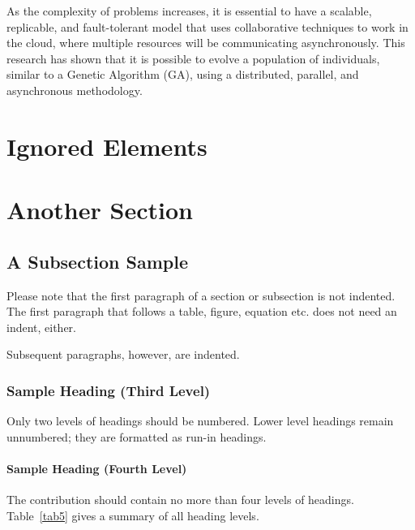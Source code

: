 \documentclass[runningheads]{llncs}
\begin{document}
As the complexity of problems increases, it is essential to have a scalable,
replicable, and fault-tolerant model that uses collaborative techniques to work
in the cloud, where multiple resources will be communicating asynchronously.
This research has shown that it is possible to evolve a population of
individuals, similar to a Genetic Algorithm (GA), using a distributed,
parallel, and asynchronous methodology.


%
%
%



% 




\section{Ignored Elements}

\section{Another Section}
\subsection{A Subsection Sample}
Please note that the first paragraph of a section or subsection is
not indented. The first paragraph that follows a table, figure,
equation etc. does not need an indent, either.

Subsequent paragraphs, however, are indented.

\subsubsection{Sample Heading (Third Level)} Only two levels of
headings should be numbered. Lower level headings remain unnumbered;
they are formatted as run-in headings.

\paragraph{Sample Heading (Fourth Level)}
The contribution should contain no more than four levels of
headings. Table~\ref{tab5} gives a summary of all heading levels.
\end{document}
